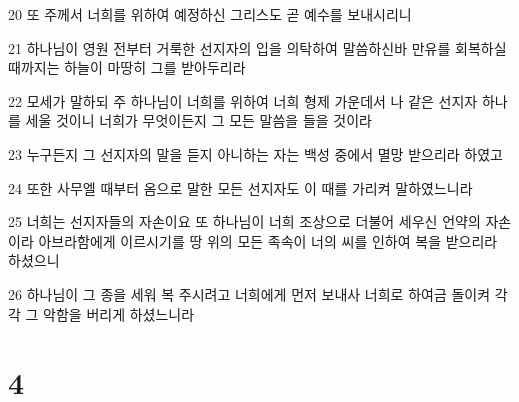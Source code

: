 \par 20 또 주께서 너희를 위하여 예정하신 그리스도 곧 예수를 보내시리니
\par 21 하나님이 영원 전부터 거룩한 선지자의 입을 의탁하여 말씀하신바 만유를 회복하실 때까지는 하늘이 마땅히 그를 받아두리라
\par 22 모세가 말하되 주 하나님이 너희를 위하여 너희 형제 가운데서 나 같은 선지자 하나를 세울 것이니 너희가 무엇이든지 그 모든 말씀을 들을 것이라
\par 23 누구든지 그 선지자의 말을 듣지 아니하는 자는 백성 중에서 멸망 받으리라 하였고
\par 24 또한 사무엘 때부터 옴으로 말한 모든 선지자도 이 때를 가리켜 말하였느니라
\par 25 너희는 선지자들의 자손이요 또 하나님이 너희 조상으로 더불어 세우신 언약의 자손이라 아브라함에게 이르시기를 땅 위의 모든 족속이 너의 씨를 인하여 복을 받으리라 하셨으니
\par 26 하나님이 그 종을 세워 복 주시려고 너희에게 먼저 보내사 너희로 하여금 돌이켜 각각 그 악함을 버리게 하셨느니라

\chapter{4}

